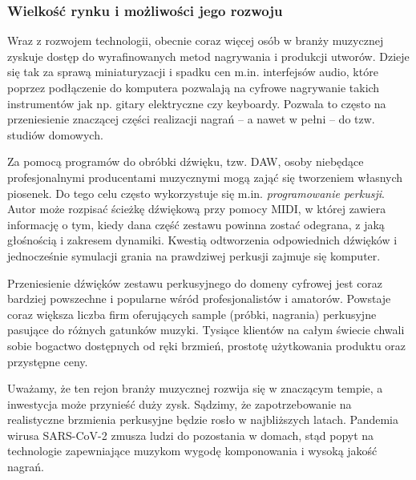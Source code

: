 \documentclass[12pt]{article}
\begin{document}
\subsubsection{Wielkość rynku i możliwości jego rozwoju}


Wraz z rozwojem technologii, obecnie coraz więcej osób w branży muzycznej zyskuje dostęp do wyrafinowanych metod nagrywania i produkcji utworów.
Dzieje się tak za sprawą miniaturyzacji i spadku cen m.in. interfejsów audio, które poprzez podłączenie do komputera pozwalają na cyfrowe nagrywanie takich instrumentów jak np. gitary elektryczne czy keyboardy.
Pozwala to często na przeniesienie znaczącej części realizacji nagrań -- a nawet w pełni -- do tzw. studiów domowych.

Za pomocą programów do obróbki dźwięku, tzw. DAW, osoby niebędące profesjonalnymi producentami muzycznymi mogą zająć się tworzeniem własnych piosenek.
Do tego celu często wykorzystuje się m.in. \emph{programowanie perkusji}.
Autor może rozpisać ścieżkę dźwiękową przy pomocy MIDI, w której zawiera informację o tym, kiedy dana część zestawu powinna zostać odegrana, z jaką głośnością i zakresem dynamiki.
Kwestią odtworzenia odpowiednich dźwięków i jednocześnie symulacji grania na prawdziwej perkusji zajmuje się komputer.

Przeniesienie dźwięków zestawu perkusyjnego do domeny cyfrowej jest coraz bardziej powszechne i popularne wśród profesjonalistów i amatorów.
Powstaje coraz większa liczba firm oferujących sample (próbki, nagrania) perkusyjne pasujące do różnych gatunków muzyki.
Tysiące klientów na całym świecie chwali sobie bogactwo dostępnych od ręki brzmień, prostotę użytkowania produktu oraz przystępne ceny.

Uważamy, że ten rejon branży muzycznej rozwija się w znaczącym tempie, a inwestycja może przynieść duży zysk.
Sądzimy, że zapotrzebowanie na realistyczne brzmienia perkusyjne będzie rosło w najbliższych latach.
Pandemia wirusa SARS-CoV-2 zmusza ludzi do pozostania w domach, stąd popyt na technologie zapewniające muzykom wygodę komponowania i wysoką jakość nagrań.
\end{document}
